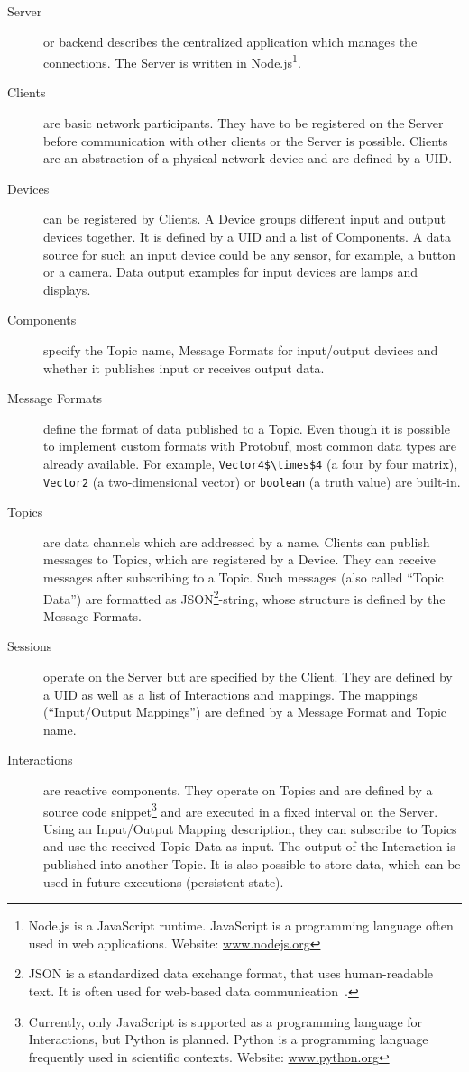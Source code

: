 \begin{description}
	\item[Server] or backend describes the centralized application which manages the connections. The Server is written in Node.js\footnote{Node.js is a JavaScript runtime. JavaScript is a programming language often used in web applications. Website: \href{https://nodejs.org/}{www.nodejs.org}}.
	\item[Clients] are basic network participants. They have to be registered on the Server before communication with other clients or the Server is possible. Clients are an abstraction of a physical network device and are defined by a \gls{UID}.
	\item[Devices] can be registered by Clients. A Device groups different input and output devices together. It is defined by a \gls{UID} and a list of Components. A data source for such an input device could be any sensor, for example, a button or a camera. Data output examples for input devices are lamps and displays.
	\item[Components] specify the Topic name, Message Formats for input/output devices and whether it publishes input or receives output data. 
	\item[Message Formats] define the format of data published to a Topic. Even though it is possible to implement custom formats with \gls{Protobuf}, most common data types are already available. For example, \lstinline[mathescape=true]{Vector4$\times$4} (a four by four matrix), \lstinline{Vector2} (a two-dimensional vector) or \lstinline{boolean} (a truth value) are built-in. %
	\item[Topics] are data channels which are addressed by a name. Clients can publish messages to Topics, which are registered by a Device. They can receive messages after subscribing to a Topic. Such messages (also called \enquote{Topic Data}) are formatted as JSON\footnote{JSON is a standardized data exchange format, that uses human-readable text. It is often used for web-based data communication~\cite[iii]{ECMAInternational.2017}.}-string, whose structure is defined by the Message Formats.
	\item[Sessions] operate on the Server but are specified by the Client. They are defined by a \gls{UID} as well as a list of Interactions and mappings. The mappings (\enquote{Input/Output Mappings}) are defined by a Message Format and Topic name.
	\item[Interactions] are reactive components. They operate on Topics and are defined by a source code snippet\footnote{Currently, only JavaScript is supported as a programming language for Interactions, but Python is planned. Python is a programming language frequently used in scientific contexts. Website: \href{https://www.python.org/}{www.python.org}} and are executed in a fixed interval on the Server. Using an Input/Output Mapping description, they can subscribe to Topics and use the received Topic Data as input. The output of the Interaction is published into another Topic. It is also possible to store data, which can be used in future executions (persistent state).

\end{description}
